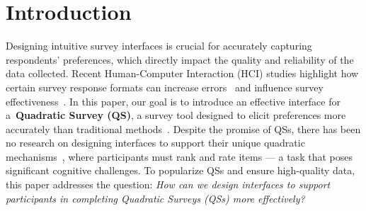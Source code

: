 \section{Introduction}

Designing intuitive survey interfaces is crucial for accurately capturing respondents' preferences, which directly impact the quality and reliability of the data collected. Recent Human-Computer Interaction (HCI) studies highlight how certain survey response formats can increase errors~\cite{pielotDidYouMisclick2024, kimComparingDataChatbot2019} and influence survey effectiveness~\cite{ugur2015evaluating}. In this paper, our goal is to introduce an effective interface for a~\textbf{Quadratic Survey (QS)}, a survey tool designed to elicit preferences more accurately than traditional methods~\cite{chengCanShowWhat2021}. Despite the promise of QSs, there has been no research on designing interfaces to support their unique quadratic mechanisms~\cite{grovesOptimalAllocationPublic1977}, where participants must rank and rate items --- a task that poses significant cognitive challenges. To popularize QSs and ensure high-quality data, this paper addresses the question: \textit{How can we design interfaces to support participants in completing Quadratic Surveys (QSs) more effectively?}

